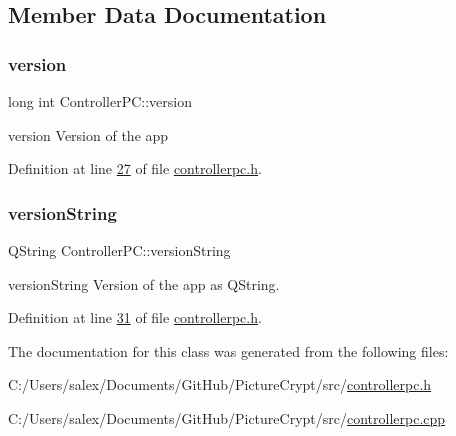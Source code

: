 \subsection{Member Data Documentation}
\mbox{\label{class_controller_p_c_a9eb43c34237d66751a6411e55cf5f55e}} 
\subsubsection{\texorpdfstring{version}{version}}
{\footnotesize\ttfamily long int Controller\+P\+C\+::version}



version Version of the app 



Definition at line \mbox{\hyperlink{controllerpc_8h_source_l00027}{27}} of file \mbox{\hyperlink{controllerpc_8h_source}{controllerpc.\+h}}.

\mbox{\label{class_controller_p_c_a0e63cca37d6ce2e660f3380400c2c5f3}} 
\subsubsection{\texorpdfstring{version\+String}{versionString}}
{\footnotesize\ttfamily Q\+String Controller\+P\+C\+::version\+String}



version\+String Version of the app as Q\+String. 



Definition at line \mbox{\hyperlink{controllerpc_8h_source_l00031}{31}} of file \mbox{\hyperlink{controllerpc_8h_source}{controllerpc.\+h}}.



The documentation for this class was generated from the following files\+:\begin{DoxyCompactItemize}
\item 
C\+:/\+Users/salex/\+Documents/\+Git\+Hub/\+Picture\+Crypt/src/\mbox{\hyperlink{controllerpc_8h}{controllerpc.\+h}}\item 
C\+:/\+Users/salex/\+Documents/\+Git\+Hub/\+Picture\+Crypt/src/\mbox{\hyperlink{controllerpc_8cpp}{controllerpc.\+cpp}}\end{DoxyCompactItemize}
